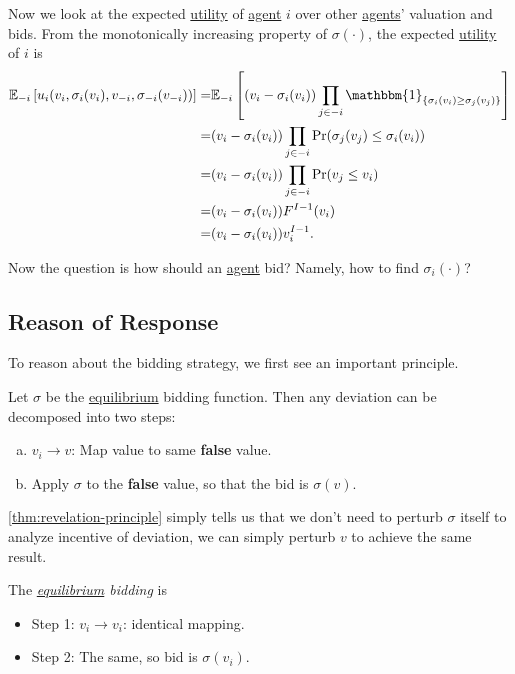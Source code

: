 Now we look at the expected \hyperref[def:reward]{utility}  of \hyperref[def:player]{agent} \(i\) over other \hyperref[def:player]{agents}' valuation and bids.
From the monotonically increasing property of \(\sigma(\cdot)\), the expected \hyperref[def:reward]{utility}  of \(i\) is
\[
	\begin{split}
		\mathbb{E}_{-i}\left[u_{i}(v_{i}, \sigma_{i}(v_{i}), v_{-i}, \sigma_{-i}(v_{-i})) \right]
		= &\mathbb{E}_{-i}\left[(v_{i} - \sigma_{i}(v_{i})) \prod\limits_{j\in -i}\mathbbm{1}_{\{ \sigma_{i}(v_{i})\geq \sigma_{j}(v_{j}) \}} \right]\\
		= &(v_{i} - \sigma_{i}(v_{i}))\prod\limits_{j\in -i}\Pr(\sigma_{j}(v_{j})\leq \sigma_{i}(v_{i}))\\
		= &(v_{i} - \sigma_{i}(v_{i}))\prod\limits_{j\in -i}\Pr(v_{j}\leq v_{i})\\
		= &(v_{i} - \sigma_{i}(v_{i}))F^{I-1}(v_{i})\\
		= &(v_{i} - \sigma_{i}(v_{i}))v_{i}^{I-1}.
	\end{split}
\]

Now the question is how should an \hyperref[def:player]{agent} bid? Namely, how to find \(\sigma_{i}(\cdot)\)?
\subsection{Reason of Response}
To reason about the bidding strategy, we first see an important principle.
\begin{theorem}\label{thm:revelation-principle}
	Let \(\sigma\) be the \hyperref[def:Nash-equilibrium]{equilibrium} bidding function. Then any deviation can be decomposed into two steps:
	\begin{enumerate}[(a)]
		\item \(v_{i}\to v\): Map value to same \textbf{false} value.
		\item Apply \(\sigma\) to the \textbf{false} value, so that the bid is \(\sigma(v)\).
	\end{enumerate}
\end{theorem}

\begin{intuition}
	\autoref{thm:revelation-principle} simply tells us that we don't need to perturb \(\sigma\) itself to analyze incentive of deviation,
	we can simply perturb \(v\) to achieve the same result.
\end{intuition}

\begin{remark}\label{rmk:equilibrium-bidding}
	The \emph{\hyperref[def:Nash-equilibrium]{equilibrium} bidding} is
	\begin{itemize}
		\item Step 1: \(v_{i}\to v_{i}\): identical mapping.
		\item Step 2: The same, so bid is \(\sigma(v_{i})\).
	\end{itemize}
\end{remark}

